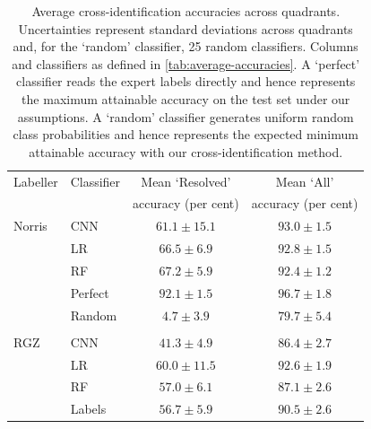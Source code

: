 \documentclass[fleqn,usenatbib,usedcolumn]{mnras}
\begin{document}
\begin{table}
  \caption{Average cross-identification accuracies across quadrants.
    Uncertainties represent standard deviations across quadrants and, for
    the `random' classifier, 25 random classifiers. Columns and
    classifiers as defined in \autoref{tab:average-accuracies}.  A
    `perfect' classifier reads the expert labels directly and hence
    represents the maximum attainable accuracy on the test set under our
    assumptions. A `random' classifier generates uniform random class
    probabilities and hence represents the expected minimum attainable
    accuracy with our cross-identification method.}
    \label{tab:cross-id-accuracies}
  \begin{tabular}{llcc}
  \hline
  Labeller & Classifier  & Mean `Resolved' & Mean `All' \\
   & & accuracy (per cent) & accuracy (per cent)\\
  \hline
  Norris & CNN & $61.1 \pm 15.1$ & $93.0 \pm 1.5$\\
   & LR & $66.5 \pm 6.9$ & $92.8 \pm 1.5$\\
   & RF & $67.2 \pm 5.9$ & $92.4 \pm 1.2$\\
   & Perfect & $92.1 \pm 1.5$ & $96.7 \pm 1.8$\\
   & Random & $4.7 \pm 3.9$ & $79.7 \pm 5.4$\\
   \\
  RGZ & CNN & $41.3 \pm 4.9$ & $86.4 \pm 2.7$\\
   & LR & $60.0 \pm 11.5$ & $92.6 \pm 1.9$\\
   & RF & $57.0 \pm 6.1$ & $87.1 \pm 2.6$\\
   & Labels & $56.7 \pm 5.9$ & $90.5 \pm 2.6$\\
   \hline
  \end{tabular}
\end{table}
\end{document}

